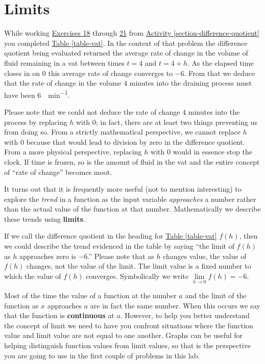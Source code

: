 \documentclass[12pt,]{book}
\newcommand{\terminology}[1]{\textbf{#1}}
\theoremstyle{plain}
\theoremstyle{definition}
\numberwithin{equation}{section}
\newcommand{\fe}[2]{#1\mathopen{}\left(#2\right)\mathclose{}}
\begin{document}
\section[Limits]{Limits}\label{section-limits}
While working \hyperlink{exercise-vat-first}{Exercises 18} through \hyperlink{exercise-vat-last}{21} from \hyperref[section-difference-quotient]{Activity \ref{section-difference-quotient}} you completed \hyperref[table-vat]{Table \ref{table-vat}}. In the context of that problem the difference quotient being evaluated returned the average rate of change in the volume of fluid remaining in a vat between times \(t=4\) and \(t=4+h\). As the elapsed time closes in on \(0\) this average rate of change converges to \(-6\). From that we deduce that the rate of change in the volume \(4\) minutes into the draining process must have been \SI{6}{\gallon\per\minute}.%
\par
Please note that we could not deduce the rate of change \(4\) minutes into the process by replacing \(h\) with \(0\); in fact, there are at least two things preventing us from doing so. From a strictly mathematical perspective, we cannot replace \(h\) with \(0\) because that would lead to division by zero in the difference quotient. From a more physical perspective, replacing \(h\) with \(0\) would in essence stop the clock. If time is frozen, so is the amount of fluid in the vat and the entire concept of ``rate of change'' becomes moot.%
\par
It turns out that it is frequently more useful (not to mention interesting) to explore the \emph{trend} in a function as the input variable \emph{approaches} a number rather than the actual value of the function at that number. Mathematically we describe these trends using \terminology{limits}.%
\par
If we call the difference quotient in the heading for \hyperref[table-vat]{Table \ref{table-vat}} \(\fe{f}{h}\), then we could describe the trend evidenced in the table by saying ``the limit of \(\fe{f}{h}\) as \(h\) approaches zero is \(-6\).'' Please note that as \(h\) changes value, the value of \(\fe{f}{h}\) changes, not the value of the limit. The limit value is a fixed number to which the value of \(\fe{f}{h}\) converges. Symbolically we write \(\lim\limits_{h\to0}\fe{f}{h}=-6\).%
\par
Most of the time the value of a function at the number \(a\) and the limit of the function as \(x\) approaches \(a\) are in fact the same number. When this occurs we say that the function is \terminology{continuous} at \(a\). However, to help you better understand the concept of limit we need to have you confront situations where the function value and limit value are not equal to one another. Graphs can be useful for helping distinguish function values from limit values, so that is the perspective you are going to use in the first couple of problems in this lab.%
\typeout{************************************************}
\typeout{************************************************}
\end{document}
